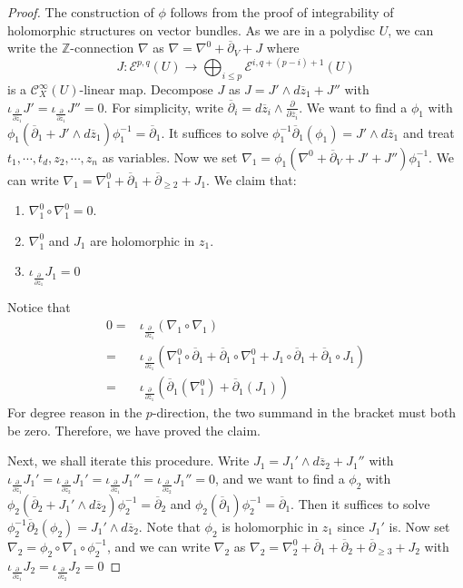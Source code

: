 \documentclass[12pt]{amsart}
\theoremstyle{definition}
\theoremstyle{remark}
\numberwithin{equation}{section}
\newcommand{\del}{\partial}
\renewcommand{\del}{\partial}
\newcommand{\cinf}{{\mathcal C}^{\infty}}
\newcommand{\1}{{\mathbb{1}}}
\begin{document}
\begin{proof}
    The construction of $\phi$ follows from the proof of integrability of holomorphic structures on vector bundles. As we are in a polydisc $U$, we can write the $\mathbb{Z}$-connection $\nabla$ as $\nabla = \nabla^0 + \overline{\del}_V + J$ where 
    $$ J: \mathcal{E}^{p, q}(U) \to \bigoplus_{i \le p} \mathcal{E}^{i, q+(p-i) +1}(U)
    $$ is a $\cinf_X(U)$-linear map. Decompose $J$ as $J = J'\wedge d\overline{z}_1 + J''$ with $\iota_{\frac{\del}{\del \overline{z}_1}} J' =\iota_{\frac{\del}{\del \overline{z}_1}} J'' = 0$. For simplicity, write $\overline{\del}_i = d\overline{z}_i \wedge \frac{\del}{\del \overline{z}_i}$. We want to find a $\phi_1$ with $\phi_1(\overline{\del}_1 + J'\wedge d\overline{z}_1) \phi_1^{-1} = \overline{\del}_1$. It suffices to solve $\phi_1^{-1}\overline{\del}_1(\phi_1) = J'\wedge d\overline{z}_1 $ and treat $t_1,\cdots, t_d, z_2, \cdots, z_n$ as variables. Now we set $\nabla_1 = \phi_1(\nabla^0 + \overline{\del}_V + J' + J'')\phi_1^{-1}$. We can write $\nabla_1 = \nabla^0_1 + \overline{\del}_1 + \overline{\del}_{\ge 2} + J_1$. We claim that:
    \begin{enumerate}
        \item $\nabla^0_1\circ \nabla^0_1 = 0.$
        \item $\nabla^0_1$ and $J_1$ are holomorphic in $z_1$.
        \item $\iota_{\frac{\del }{\del \overline{z}_1}} J_1 = 0$
    \end{enumerate}
    Notice that 
    \begin{align*}
        0 =& \iota_{\frac{\del }{\del \overline{z}_1}}(\nabla_1 \circ \nabla_1)\\
        =&\iota_{\frac{\del }{\del \overline{z}_1}}(\nabla^0_1\circ \overline{\del}_1 + \overline{\del}_1 \circ \nabla^0_1 + J_1\circ \overline{\del}_1 +  \overline{\del}_1 \circ J_1 )\\
        =& \iota_{\frac{\del }{\del \overline{z}_1}}(\overline{\del}_1(\nabla^0_1) + \overline{\del}_1(J_1))
    \end{align*}
    For degree reason in the $p$-direction, the two summand in the bracket must both be zero. Therefore, we have proved the claim.
    
    Next, we shall iterate this procedure. Write $J_1 = J_1' \wedge d\overline{z}_2 + J_1''$ with $\iota_{\frac{\del}{\del \overline{z}_1}} J_1'= \iota_{\frac{\del}{\del \overline{z}_2}} J_1' =\iota_{\frac{\del}{\del \overline{z}_1}} J_1'' = \iota_{\frac{\del}{\del \overline{z}_2}} J_1''=0$, and we want to find a $\phi_2$ with $\phi_2(\overline{\del}_2 + J_1'\wedge d\overline{z}_2) \phi_2^{-1} = \overline{\del}_2$ and $\phi_2(\overline{\del}_1)\phi_2^{-1}= \overline{\del}_1$. Then it suffices to solve $\phi_2^{-1}\overline{\del}_2(\phi_2) = J_1'\wedge d\overline{z}_2 $. Note that $\phi_2$ is holomorphic in $z_1$ since $J_1'$ is. Now set $\nabla_2 = \phi_2 \circ \nabla_1 \circ \phi_2^{-1}$, and we can write $\nabla_2$ as $\nabla_2 =  \nabla^0_2 + \overline{\del}_1 + \overline{\del}_{2}+ \overline{\del}_{\ge 3} + J_2$ with $\iota_{\frac{\del }{\del \overline{z}_1}} J_2 = \iota_{\frac{\del }{\del \overline{z}_2}} J_2 =0$
    

\end{proof}
\end{document}
